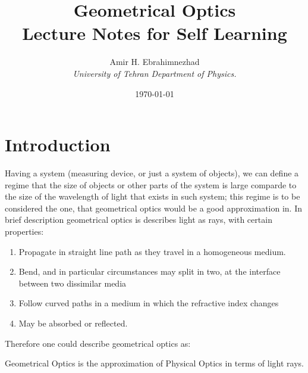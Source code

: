 \documentclass[9pt,a4paper, twocolumn]{article}
\title{Geometrical Optics \\ \large Lecture Notes for Self Learning}
\date{\today}
\author{Amir H. Ebrahimnezhad \\ \small \textit{University of Tehran Department of Physics.}}
\begin{document}
    \maketitle
    \tableofcontents
    \section{Introduction}
        Having a system (measuring device, or just a system of objects), we can define a regime that the size of objects or other parts of the system is large comparde to the size of the wavelength of light that exists in such system; this regime is to be considered the one, that geometrical optics would be a good approximation in. In brief description geometrical optics is describes light as rays, with certain properties:
        \begin{enumerate}
            \item Propagate in straight line path as they travel in a homogeneous medium.
            \item Bend, and in particular circumstances may split in two, at the interface between two dissimilar media
            \item Follow curved paths in a medium in which the refractive index changes 
            \item May be absorbed or reflected.
        \end{enumerate}
        Therefore one could describe geometrical optics as:
        \begin{center}
            Geometrical Optics is the approximation of Physical Optics in terms of light rays.
        \end{center}
\end{document}
